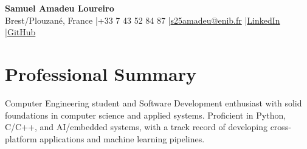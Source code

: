 \documentclass[10pt,a4paper]{article}
\begin{document}
\begin{center}
    {\Huge\bfseries\color{primary} Samuel Amadeu Loureiro}\\[2.5pt]
    \small\color{subtext}
    Brest/Plouzané, France
    \quad|\quad +33 7 43 52 84 87
    \quad|\quad \href{mailto:s25amadeu@enib.fr}{s25amadeu@enib.fr}
    \quad|\quad \href{https://www.linkedin.com/in/samuelamadeuloureiro}{LinkedIn}
    \quad|\quad \href{https://github.com/SamuelLoureiro}{GitHub}
\end{center}
\vspace{-6pt}

\section{Professional Summary}
\small\color{primary}
Computer Engineering student and Software Development enthusiast with solid foundations in computer science and applied systems. Proficient in Python, C/C++, and AI/embedded systems, with a track record of developing cross-platform applications and machine learning pipelines.

\end{document}
